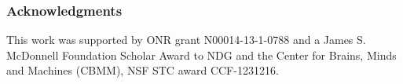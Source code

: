 \documentclass[10pt,letterpaper]{article}
\begin{document}
\subsubsection{Acknowledgments}
\small
This work was supported by ONR grant N00014-13-1-0788 and a James S. McDonnell Foundation Scholar Award to NDG and the Center for Brains, Minds and Machines (CBMM), NSF STC award CCF-1231216. 


\setlength{\bibleftmargin}{.125in}
\setlength{\bibindent}{-\bibleftmargin}

\end{document}
